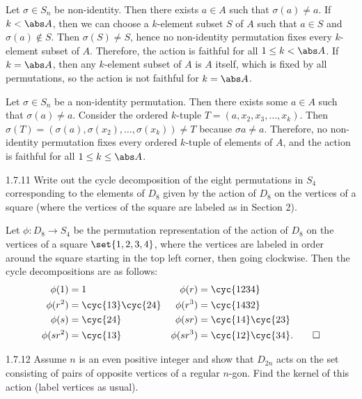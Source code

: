 \begin{solenum}
    \item Let $\sigma \in S_n$ be non-identity.
	Then there exists $a \in A$ such that $\sigma(a) \neq a$.
	If $k < \abs A$, then we can choose a $k$-element subset $S$ of $A$ such that $a \in S$ and $\sigma(a) \notin S$.
	Then $\sigma(S) \neq S$, hence no non-identity permutation fixes every $k$-element subset of $A$.
	Therefore, the action is faithful for all $1 \leq k < \abs A$.
	If $k = \abs A$, then any $k$-element subset of $A$ is $A$ itself, which is fixed by all permutations, so the action is not faithful for $k = \abs A$.
    \item Let $\sigma \in S_n$ be a non-identity permutation.
	Then there exists some $a \in A$ such that $\sigma(a) \neq a$.
	Consider the ordered $k$-tuple $T = (a, x_2, x_3, \ldots, x_k)$.
	Then $\sigma(T) = (\sigma(a), \sigma(x_2), \ldots, \sigma(x_k)) \neq T$ because $\sigma a \neq a$.
	Therefore, no non-identity permutation fixes every ordered $k$-tuple of elements of $A$, and the action is faithful for all $1 \leq k \leq \abs A$.
\end{solenum}

\begin{exercise}{1.7.11}
    Write out the cycle decomposition of the eight permutations in $S_4$ corresponding to the elements of $D_8$ given by the action of $D_8$ on the vertices of a square (where the vertices of the square are labeled as in Section 2).
\end{exercise}

\begin{sol}
    Let $\phi : D_8 \to S_4$ be the permutation representation of the action of $D_8$ on the vertices of a square $\set{1, 2, 3, 4}$, where the vertices are labeled in order around the square starting in the top left corner, then going clockwise.
	Then the cycle decompositions are as follows:
    \begin{align*}
        \phi(1) & = 1 & \phi(r) & = \cyc{1 2 3 4} \\
        \phi(r^2) & = \cyc{1 3}\cyc{2 4} & \phi(r^3) & = \cyc{1 4 3 2} \\
        \phi(s) & = \cyc{2 4} & \phi(sr) & = \cyc{1 4}\cyc{2 3} \\
        \phi(sr^2) & = \cyc{1 3} & \phi(sr^3) & = \cyc{1 2}\cyc{3 4}. \qedhere
    \end{align*}
\end{sol}

\begin{exercise}{1.7.12}
    Assume $n$ is an even positive integer and show that $D_{2n}$ acts on the set consisting of pairs of opposite vertices of a regular $n$-gon.
	Find the kernel of this action (label vertices as usual).
\end{exercise}

